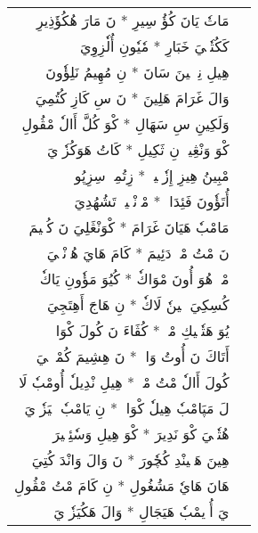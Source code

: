 \documentclass[a4paper, 12pt]{report}
\begin{document}
\begin{longtable}{rl}
\textarabic{مَاتٗ يَانَ كُؤُ سِيرِ  *  نَ مَارَ هُكُؤَذِيرِ} & \\ 
\textarabic{كَكُتٗلٖيَ خَبَارِ  *  مٗيٗونِ أُلٗزِوِيَ} & \\ 
[8mm] 

\textarabic{هِيلِ نِمٖنٖينَ سَانَ  *  نِ مُهِيمُ نَلِؤٗونَ} & \\ 
\textarabic{وَالَ غَرَامَ هَلِينَ  *  نَ سِ كَازِ كُتُمِيَ} & \\ 
[8mm] 

\textarabic{وَلَكِينِ سِ سَهَالِ  *  كْوَ كُلَّ أَالٗ مْڤُولِ} & \\ 
\textarabic{كْوَ وَنْڠِينٖ نِ ثَكِيلِ  *  كَاتُ هَوَكُزٗوٖيَ} & \\ 
[8mm] 

\textarabic{مْبِينُ هِيزِ إِزٗئٖيزٖ  *  زِتُمِيٖ سِزِپُوزٖ} & \\ 
\textarabic{أُتَؤٗونَ فَئِدَازٖ  *  مْوٖنْيٖيوٖ تَشُهُدِيَ} & \\ 
[8mm] 

\textarabic{مَامْبٗ هَيَانَ غَرَامَ  *  كْوَنْڠَلِيَ نَ كُسٖيمَ} & \\ 
\textarabic{نَ مْتُ مْكٖ دَئِيمَ  *  كَامَ هَايَ هُزٖنْڠٖيَ} & \\ 
[8mm] 

\textarabic{مْكٖ هُوَ أُونَ مْوَاكٗ  *  كُيُوَ مَؤٗونِ يَاكٗ} & \\ 
\textarabic{كُسِكِيَ نٖينٗ لَاكٗ  *  نِ هَاجَ أَهِتَجِيَ} & \\ 
[8mm] 

\textarabic{يُوَ هَتٗشٖيكِ مْكٖ  *  كُڤَاءَ نَ كُولَ كْوَاكٖ} & \\ 
\textarabic{أَتَاكَ نَ أُوتُ وَاكٖ  *  نَ هِشِيمَ كُمْوٖكٖيَ} & \\ 
[8mm] 

\textarabic{كُولَ أَالٗ مْتُ مْكٖ  *  هِيلِ نْدِيلٗ أُومْبٗ لَاكٖ} & \\ 
\textarabic{لَ مَپَامْبٗ هِيلٗ كْوَاكٖ  *  نِ يَامْبٗ مٖيَزٗوٖيَ} & \\ 
[8mm] 

\textarabic{هُتٗكٖيَ كْوَ نَدِيرَ  *  كْوَ هِيلِ وَسٗئِكٖيرَ} & \\ 
\textarabic{هِينَ هَپٖينْدِ كُچٗورَ  *  نَ وَالَ وَانْدَ كُتِيَ} & \\ 
[8mm] 

\textarabic{هَانَ هَايٗ مَشُغُولِ  *  نِ كَامَ مْتُ مْڤُولِ} & \\ 
\textarabic{يَ أُرٖيمْبٗ هَيَجَالِ  *  وَالَ هَكُيَزٗوٖيَ} & \\ 
[8mm] 


\end{longtable}
\end{document}
